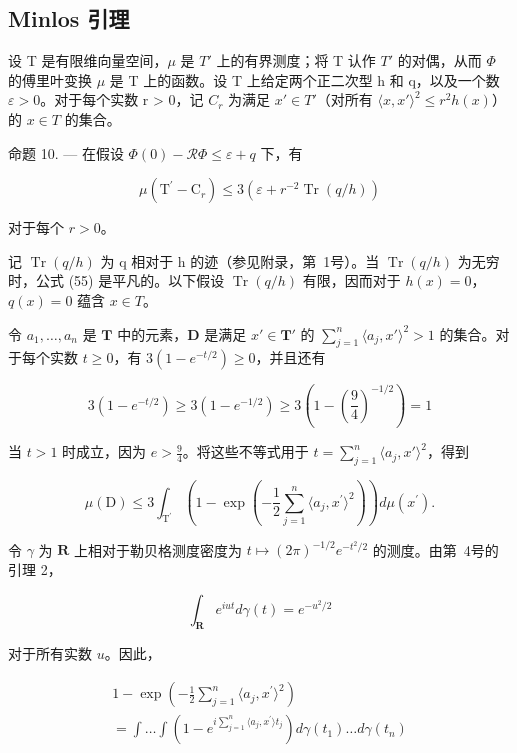 \subsection{Minlos 引理}

设 T 是有限维向量空间，\(\mu\) 是 \(T'\) 上的有界测度；将 T 认作 \(T'\) 的对偶，从而 \(\Phi\) 的傅里叶变换 \(\mu\) 是 T 上的函数。设 T 上给定两个正二次型 h 和 q，以及一个数 \(\varepsilon > 0\)。对于每个实数 r > 0，记 \(C_{r}\) 为满足 \(x' \in T'\)（对所有 \(\langle x, x' \rangle^{2} \leqslant r^{2} h(x)\)）的 \(x \in T\) 的集合。

命题 10. --- 在假设 \(\Phi(0) - \mathcal{R}\Phi \leqslant \varepsilon + q\) 下，有

\[
\mu (\mathrm{T} ^ {\prime} - \mathrm{C} _ {r}) \leqslant 3 \left(\varepsilon + r ^ {- 2} \operatorname{Tr} (q / h)\right)\tag{55}
\]

对于每个 \(r > 0\)。

记 \(\operatorname{Tr}(q/h)\) 为 q 相对于 h 的迹（参见附录，第~1号）。当 \(\operatorname{Tr}(q/h)\) 为无穷时，公式 (55) 是平凡的。以下假设 \(\operatorname{Tr}(q/h)\) 有限，因而对于 \(h(x)=0\)，\(q(x)=0\) 蕴含 \(x\in T\)。

令 \(a_1, \ldots, a_n\) 是 \(\mathbf{T}\) 中的元素，\(\mathbf{D}\) 是满足 \(x' \in \mathbf{T}'\) 的 \(\sum_{j=1}^{n} \langle a_j, x' \rangle^2 > 1\) 的集合。对于每个实数 \(t \geqslant 0\)，有 \(3(1 - e^{-t/2}) \geqslant 0\)，并且还有

\[
3 (1 - e ^ {- t / 2}) \geqslant 3 (1 - e ^ {- 1 / 2}) \geqslant 3 \left(1 - \left(\frac {9}{4}\right) ^ {- 1 / 2}\right) = 1
\]

当 \(t > 1\) 时成立，因为 \(e > \frac{9}{4}\)。将这些不等式用于 \(t = \sum_{j=1}^{n} \langle a_j, x' \rangle^2\)，得到

\[
\mu (\mathrm{D}) \leqslant 3 \int_ {\mathrm{T} ^ {\prime}} \left(1 - \exp \left(- \frac {1}{2} \sum_ {j = 1} ^ {n} \langle a _ {j}, x ^ {\prime} \rangle^ {2}\right)\right) d \mu (x ^ {\prime}).\tag{56}
\]

令 \(\gamma\) 为 \(\mathbf{R}\) 上相对于勒贝格测度密度为 \(t \mapsto (2\pi)^{-1/2} e^{-t^2/2}\) 的测度。由第~4号的引理 2，

\[
\int_ {\mathbf {R}} e ^ {i u t} d \gamma (t) = e ^ {- u ^ {2} / 2}
\]

对于所有实数 \(u\)。因此，

\[
\begin{array}{l} 1 - \exp \left(- \frac {1}{2} \sum_ {j = 1} ^ {n} \langle a _ {j}, x ^ {\prime} \rangle^ {2}\right) \\ = \int \dots \int \left(1 - e ^ {i \sum_ {j = 1} ^ {n} \langle a _ {j}, x ^ {\prime} \rangle t _ {j}}\right) d \gamma (t _ {1}) \dots d \gamma (t _ {n}) \end{array}\tag{57}
\]


